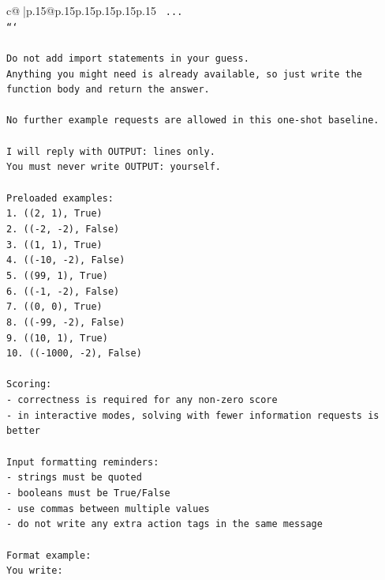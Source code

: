 \documentclass{article}
\begin{document}
{\begin{supertabular}{c@{$\;$}|p{.15\linewidth}@{}p{.15\linewidth}p{.15\linewidth}p{.15\linewidth}p{.15\linewidth}p{.15\linewidth}}
{{{\texttt{    ...} \\
\texttt{```} \\
\\ 
\texttt{Do not add import statements in your guess.} \\
\texttt{Anything you might need is already available, so just write the function body and return the answer.} \\
\\ 
\texttt{No further example requests are allowed in this one{-}shot baseline.} \\
\\ 
\texttt{I will reply with OUTPUT: lines only.} \\
\texttt{You must never write OUTPUT: yourself.} \\
\\ 
\texttt{Preloaded examples:} \\
\texttt{1. ((2, 1), True)} \\
\texttt{2. (({-}2, {-}2), False)} \\
\texttt{3. ((1, 1), True)} \\
\texttt{4. (({-}10, {-}2), False)} \\
\texttt{5. ((99, 1), True)} \\
\texttt{6. (({-}1, {-}2), False)} \\
\texttt{7. ((0, 0), True)} \\
\texttt{8. (({-}99, {-}2), False)} \\
\texttt{9. ((10, 1), True)} \\
\texttt{10. (({-}1000, {-}2), False)} \\
\\ 
\texttt{Scoring:} \\
\texttt{{-} correctness is required for any non{-}zero score} \\
\texttt{{-} in interactive modes, solving with fewer information requests is better} \\
\\ 
\texttt{Input formatting reminders:} \\
\texttt{{-} strings must be quoted} \\
\texttt{{-} booleans must be True/False} \\
\texttt{{-} use commas between multiple values} \\
\texttt{{-} do not write any extra action tags in the same message} \\
\\ 
\texttt{Format example:} \\
\texttt{You write:} \\
}}}
\end{supertabular}}
\end{document}
